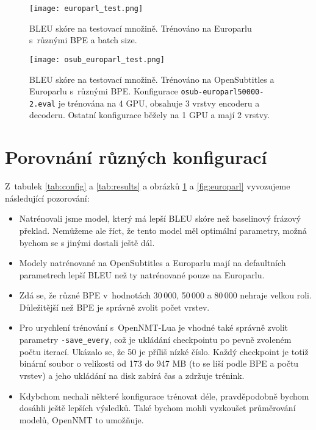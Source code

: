 \documentclass[a4]{article}
\begin{document}
\begin{figure}[p]
\centering
  \texttt{[image: europarl\_test.png]}
    \caption{BLEU skóre na testovací množině. Trénováno na Europarlu
	s~různými BPE a batch size.}
  \label{fig:europarl}
  \texttt{[image: osub\_europarl\_test.png]}
    \caption{BLEU skóre na testovací množině. Trénováno na OpenSubtitles a Europarlu
	s~různými BPE. Konfigurace \texttt{osub-europarl50000-2.eval} je trénována
	na 4 GPU, obsahuje 3 vrstvy encoderu a decoderu. Ostatní konfigurace běžely
	na 1 GPU a mají 2 vrstvy.}
  \label{fig:osub}
\end{figure}



\section{Porovnání různých konfigurací}

Z~tabulek \ref{tab:config} a \ref{tab:results} a obrázků 
\ref{fig:osub} a \ref{fig:europarl} vyvozujeme následující pozorování:

\begin{itemize}

\item Natrénovali jsme model, který má lepší BLEU skóre než baselinový frázový
překlad. Nemůžeme ale říct, že tento model měl optimální parametry, možná
bychom se s jinými dostali ještě dál.

\item Modely natrénované na OpenSubtitles a Europarlu mají na defaultních
parametrech lepší BLEU než ty
natrénované pouze na Europarlu. 

\item Zdá se, že různé BPE v~hodnotách 30\,000, 50\,000 a 80\,000 nehraje
velkou roli. Důležitější než BPE je správně zvolit počet vrstev.

\item Pro urychlení trénování s~OpenNMT-Lua je vhodné také správně zvolit parametry
\texttt{-save\_every}, což je ukládání checkpointu po pevně zvoleném počtu
iterací. Ukázalo se, že 50 je příliš nízké číslo. Každý checkpoint je totiž
binární soubor o velikosti od 173 do 947 MB (to se liší podle BPE a počtu
vrstev) a jeho ukládání na disk zabírá čas a zdržuje trénink.

\item Kdybchom nechali některé konfigurace trénovat déle, pravděpodobně
bychom dosáhli ještě lepších výsledků. Také bychom mohli vyzkoušet
průměrování modelů, OpenNMT to umožňuje. 
  


\end{itemize}
\end{document}
